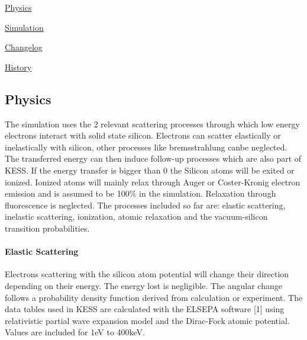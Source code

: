 \begin{DoxyEnumerate}
\item \hyperlink{_k_e_s_s_physics}{Physics} 
\item \hyperlink{_k_e_s_s_simulation}{Simulation} 
\item \hyperlink{_k_e_s_s_changelog}{Changelog} 
\item \hyperlink{_k_e_s_s_history}{History} 
\end{DoxyEnumerate}\hypertarget{KESSPhysics}{}\subsection{Physics}\label{KESSPhysics}
The simulation uses the 2 relevant scattering processes through which low energy electrons interact with solid state silicon. Electrons can scatter elastically or inelastically with silicon, other processes like bremsstrahlung canbe neglected. The transferred energy can then induce follow-\/up processes which are also part of KESS. If the energy transfer is bigger than 0 the Silicon atoms will be exited or ionized. Ionized atoms will mainly relax through Auger or Coster-\/Kronig electron emission and is assumed to be 100\% in the simulation. Relaxation through fluorescence is neglected. The processes included so far are: elastic scattering, inelastic scattering, ionization, atomic relaxation and the vacuum-\/silicon transition probabilities.\hypertarget{_k_e_s_s_physics_elastic}{}\paragraph{Elastic Scattering}\label{_k_e_s_s_physics_elastic}
Electrons scattering with the silicon atom potential will change their direction depending on their energy. The energy lost is negligible. The angular change follows a probability density function derived from calculation or experiment. The data tables used in KESS are calculated with the ELSEPA software \mbox{[}1\mbox{]} using relativistic partial wave expansion model and the Dirac-\/Fock atomic potential. Values are included for 1eV to 400keV.

